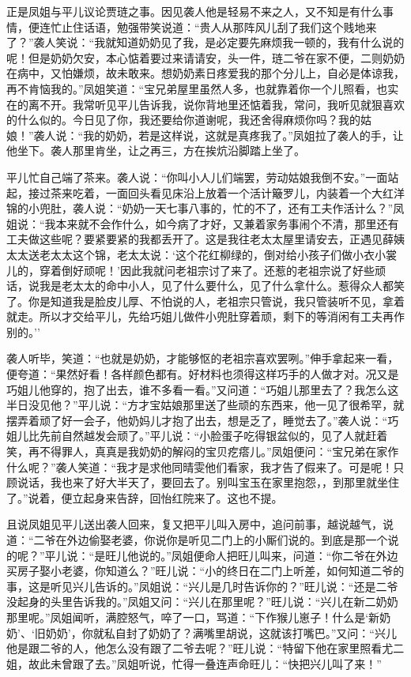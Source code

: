 正是凤姐与平儿议论贾琏之事。因见袭人他是轻易不来之人，又不知是有什么事情，便连忙止住话语，勉强带笑说道：``贵人从那阵风儿刮了我们这个贱地来了？''袭人笑说：``我就知道奶奶见了我，是必定要先麻烦我一顿的，我有什么说的呢！但是奶奶欠安，本心惦着要过来请请安，头一件，琏二爷在家不便，二则奶奶在病中，又怕嫌烦，故未敢来。想奶奶素日疼爱我的那个分儿上，自必是体谅我，再不肯恼我的。''凤姐笑道：``宝兄弟屋里虽然人多，也就靠着你一个儿照看，也实在的离不开。我常听见平儿告诉我，说你背地里还惦着我，常问，我听见就狠喜欢的什么似的。今日见了你，我还要给你道谢呢，我还舍得麻烦你吗？我的姑娘！''袭人说：``我的奶奶，若是这样说，这就是真疼我了。''凤姐拉了袭人的手，让他坐下。袭人那里肯坐，让之再三，方在挨炕沿脚踏上坐了。

平儿忙自己端了茶来。袭人说：``你叫小人儿们端罢，劳动姑娘我倒不安。''一面站起，接过茶来吃着，一面回头看见床沿上放着一个活计簸罗儿，内装着一个大红洋锦的小兜肚，袭人说：``奶奶一天七事八事的，忙的不了，还有工夫作活计么？''凤姐说：``我本来就不会作什么，如今病了才好，又兼着家务事闹个不清，那里还有工夫做这些呢？要紧要紧的我都丢开了。这是我往老太太屋里请安去，正遇见薛姨太太送老太太这个锦，老太太说：`这个花红柳绿的，倒对给小孩子们做小衣小裳儿的，穿着倒好顽呢！'因此我就问老祖宗讨了来了。还惹的老祖宗说了好些顽话，说我是老太太的命中小人，见了什么要什么，见了什么拿什么。惹得众人都笑了。你是知道我是脸皮儿厚、不怕说的人，老祖宗只管说，我只管装听不见，拿着就走。所以才交给平儿，先给巧姐儿做件小兜肚穿着顽，剩下的等消闲有工夫再作别的。''

袭人听毕，笑道：``也就是奶奶，才能够怄的老祖宗喜欢罢咧。''伸手拿起来一看，便夸道：``果然好看！各样颜色都有。好材料也须得这样巧手的人做才对。况又是巧姐儿他穿的，抱了出去，谁不多看一看。''又问道：``巧姐儿那里去了？我怎么这半日没见他？''平儿说：``方才宝姑娘那里送了些顽的东西来，他一见了很希罕，就摆弄着顽了好一会子，他奶妈儿才抱了出去，想是乏了，睡觉去了。''袭人说：``巧姐儿比先前自然越发会顽了。''平儿说：``小脸蛋子吃得银盆似的，见了人就赶着笑，再不得罪人，真真是我奶奶的解闷的宝贝疙瘩儿。''凤姐便问：``宝兄弟在家作什么呢？''袭人笑道：``我才是求他同晴雯他们看家，我才告了假来了。可是呢！只顾说话，我也来了好大半天了，要回去了。别叫宝玉在家里抱怨，，到那里就坐住了。''说着，便立起身来告辞，回怡红院来了。这也不提。

且说凤姐见平儿送出袭人回来，复又把平儿叫入房中，追问前事，越说越气，说道：``二爷在外边偷娶老婆，你说你是听见二门上的小厮们说的。到底是那一个说的呢？''平儿说：``是旺儿他说的。''凤姐便命人把旺儿叫来，问道：``你二爷在外边买房子娶小老婆，你知道么？''旺儿说：``小的终日在二门上听差，如何知道二爷的事，这是听见兴儿告诉的。''凤姐说：``兴儿是几时告诉你的？''旺儿说：``还是二爷没起身的头里告诉我的。''凤姐又问：``兴儿在那里呢？''旺儿说：``兴儿在新二奶奶那里呢。''凤姐闻听，满腔怒气，啐了一口，骂道：``下作猴儿崽子！什么是`新奶奶'、`旧奶奶'，你就私自封了奶奶了？满嘴里胡说，这就该打嘴巴。''又问：``兴儿他是跟二爷的人，他怎么没有跟了二爷去呢？''旺儿说：``特留下他在家里照看尤二姐，故此未曾跟了去。''凤姐听说，忙得一叠连声命旺儿：``快把兴儿叫了来！''

